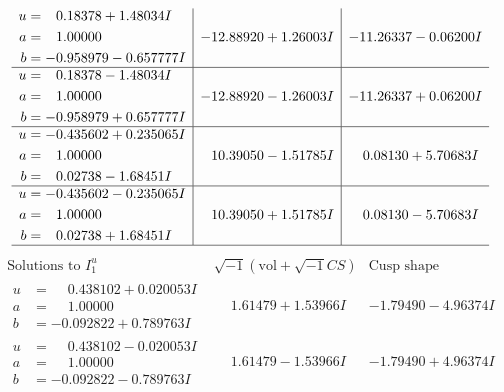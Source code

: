 \documentclass[1p]{elsarticle_modified}
\theoremstyle{definition}
\newcommand{\I}{\sqrt{-1}}
\begin{document}
$$\begin{array}{c|c|c}
\begin{aligned}
u &= \phantom{-}0.18378 + 1.48034 I \\
a &= \phantom{-}1.00000\phantom{ +0.000000I} \\
b &= -0.958979 - 0.657777 I\end{aligned}
 & -12.88920 + 1.26003 I & -11.26337 - 0.06200 I \\ \hline\begin{aligned}
u &= \phantom{-}0.18378 - 1.48034 I \\
a &= \phantom{-}1.00000\phantom{ +0.000000I} \\
b &= -0.958979 + 0.657777 I\end{aligned}
 & -12.88920 - 1.26003 I & -11.26337 + 0.06200 I \\ \hline\begin{aligned}
u &= -0.435602 + 0.235065 I \\
a &= \phantom{-}1.00000\phantom{ +0.000000I} \\
b &= \phantom{-}0.02738 - 1.68451 I\end{aligned}
 & \phantom{-}10.39050 - 1.51785 I & \phantom{-}0.08130 + 5.70683 I \\ \hline\begin{aligned}
u &= -0.435602 - 0.235065 I \\
a &= \phantom{-}1.00000\phantom{ +0.000000I} \\
b &= \phantom{-}0.02738 + 1.68451 I\end{aligned}
 & \phantom{-}10.39050 + 1.51785 I & \phantom{-}0.08130 - 5.70683 I\\
 \hline 
 \end{array}$$\newpage$$\begin{array}{c|c|c}  
\text{Solutions to }I^u_{1}& \I (\text{vol} + \sqrt{-1}CS) & \text{Cusp shape}\\
 \hline 
\begin{aligned}
u &= \phantom{-}0.438102 + 0.020053 I \\
a &= \phantom{-}1.00000\phantom{ +0.000000I} \\
b &= -0.092822 + 0.789763 I\end{aligned}
 & \phantom{-}1.61479 + 1.53966 I & -1.79490 - 4.96374 I \\ \hline\begin{aligned}
u &= \phantom{-}0.438102 - 0.020053 I \\
a &= \phantom{-}1.00000\phantom{ +0.000000I} \\
b &= -0.092822 - 0.789763 I\end{aligned}
 & \phantom{-}1.61479 - 1.53966 I & -1.79490 + 4.96374 I \\ \hline\begin{aligned}

\end{aligned}
\end{array}$$
\end{document}

